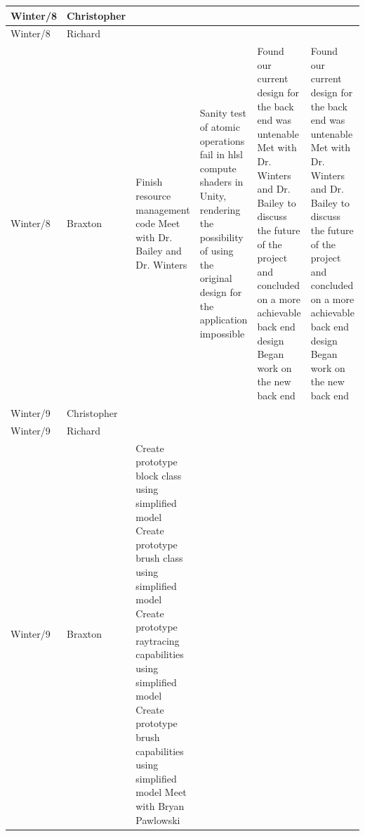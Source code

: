 \documentclass[onecolumn, draftclsnofoot,10pt, compsoc]{IEEEtran}
\begin{document}
\begin{tiny}
\begin{longtable}{ | p{} | p{} | p{} | p{} | p{} | p{} | }
\\ \hline
Winter/8 & Christopher & 

&

&

&

\\ \hline
Winter/8 & Richard & 

&

&

&

\\ \hline
Winter/8 & Braxton & 

Finish resource management code \newline
Meet with Dr. Bailey and Dr. Winters 

&

Sanity test of atomic operations fail in hlsl compute shaders in Unity, rendering the possibility of using the original design for the application impossible 

&

Found our current design for the back end was untenable \newline
Met with Dr. Winters and Dr. Bailey to discuss the future of the project and concluded on a more achievable back end design \newline
Began work on the new back end 

&

Found our current design for the back end was untenable \newline
Met with Dr. Winters and Dr. Bailey to discuss the future of the project and concluded on a more achievable back end design \newline
Began work on the new back end 

\\ \hline
Winter/9 & Christopher & 

&

&

&

\\ \hline
Winter/9 & Richard & 

&

&

&

\\ \hline
Winter/9 & Braxton & 

Create prototype block class using simplified model \newline
Create prototype brush class using simplified model \newline
Create prototype raytracing capabilities using simplified model \newline
Create prototype brush capabilities using simplified model \newline
Meet with Bryan Pawlowski 


\end{longtable}
\end{tiny}
\end{document}

